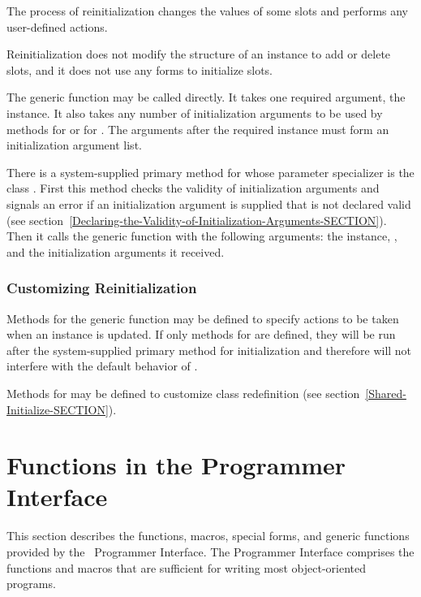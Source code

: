 The process of reinitialization changes the values of some slots and
performs any user-defined actions.

Reinitialization does not modify the structure
of an instance to add or delete slots, and it does not use any 
 forms to initialize slots.

The generic function  may be called
directly.  It takes one required argument, the instance.  It also
takes any number of initialization arguments to be used by methods for
 or for . The
arguments after the required instance must form an initialization
argument list.

There is a system-supplied primary method for 
 whose parameter specializer is the class 
.  First this method checks the validity of
initialization arguments and signals an error if an initialization
argument is supplied that is not declared valid (see
section~\ref{Declaring-the-Validity-of-Initialization-Arguments-SECTION}).
Then it calls the generic function 
 with the following arguments: the instance, 
, and the initialization arguments it received.


\subsubsection{Customizing Reinitialization}

Methods for the generic function  may be defined to specify
actions to be taken when an instance is updated.  If only 
methods for  are defined, they will be run
after the system-supplied primary method for initialization and
therefore will not interfere with the default behavior of 
.

Methods for  may be defined to customize class
redefinition (see section~\ref{Shared-Initialize-SECTION}).


\section{Functions in the Programmer Interface}
\label{Functions-in-the-Programmer-Interface-SECTION}

This section describes the functions, macros, special forms, and
generic functions provided by the \CLOS\ Programmer Interface.  The
Programmer Interface comprises the functions and macros that are
sufficient for writing most object-oriented programs.

